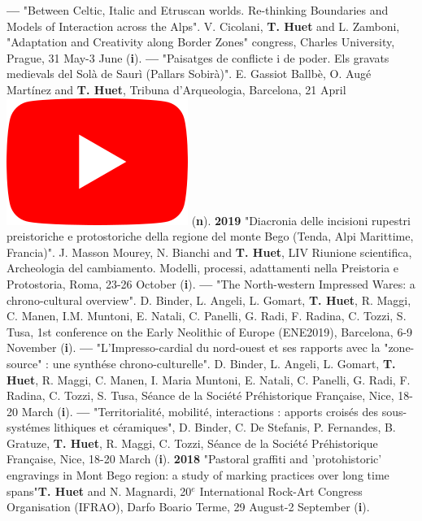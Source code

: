 \documentclass{article}
\begin{document}
\smallbreak
\textbf{--- }"Between Celtic, Italic and Etruscan worlds. Re-thinking Boundaries and Models of Interaction across the Alps". V. Cicolani, \textbf{T. Huet} and L. Zamboni, "Adaptation and Creativity along Border Zones" congress, Charles University, Prague, 31 May-3 June (\textbf{i}).
\smallbreak
\textbf{--- }"Paisatges de conflicte i de poder. Els gravats medievals del Sol\`{a} de Saur\`{i} (Pallars Sobir\`{a})". E. Gassiot Ballb\`{e}, O. Aug\'{e} Mart\'{i}nez and \textbf{T. Huet}, Tribuna d'Arqueologia, Barcelona, 21 April \href{https://www.youtube.com/watch?v=4b7gLw4NV_E}{\includegraphics[scale=0.2]{icon_youtube}} (\textbf{n}).
\smallbreak
\textbf{2019 }"Diacronia delle incisioni rupestri preistoriche e protostoriche della regione del monte Bego (Tenda, Alpi Marittime, Francia)". J. Masson Mourey, N. Bianchi and \textbf{T. Huet}, LIV Riunione scientifica, Archeologia del cambiamento. Modelli, processi, adattamenti nella Preistoria e Protostoria, Roma, 23-26 October (\textbf{i}).
\smallbreak
\textbf{--- }"The North-western Impressed Wares: a chrono-cultural overview". D. Binder, L. Angeli, L. Gomart, \textbf{T. Huet}, R. Maggi, C. Manen, I.M. Muntoni, E. Natali, C. Panelli, G. Radi, F. Radina, C. Tozzi, S. Tusa, 1st conference on the Early Neolithic of Europe (ENE2019), Barcelona, 6-9 November (\textbf{i}).
\smallbreak
\textbf{--- }"L'Impresso-cardial du nord-ouest et ses rapports avec la "zone-source" : une synth\'{e}se chrono-culturelle". D. Binder, L. Angeli, L. Gomart, \textbf{T. Huet}, R. Maggi, C. Manen, I. Maria Muntoni, E. Natali, C. Panelli, G. Radi, F. Radina, C. Tozzi, S. Tusa, S\'{e}ance de la Soci\'{e}t\'{e} Pr\'{e}historique Fran\c{c}aise, Nice, 18-20 March (\textbf{i}).
\smallbreak
\textbf{--- }"Territorialit\'{e}, mobilit\'{e}, interactions : apports crois\'{e}s des sous-syst\'{e}mes lithiques et c\'{e}ramiques", D. Binder, C. De Stefanis, P. Fernandes, B. Gratuze, \textbf{T. Huet}, R. Maggi, C. Tozzi, S\'{e}ance de la Soci\'{e}t\'{e} Pr\'{e}historique Fran\c{c}aise, Nice, 18-20 March (\textbf{i}).
\smallbreak
\textbf{2018 }"Pastoral graffiti and 'protohistoric' engravings in Mont Bego region: a study of marking practices over long time spans"\textbf{T. Huet} and N. Magnardi, 20${}^{e}$ International Rock-Art Congress Organisation (IFRAO), Darfo Boario Terme, 29 August-2 September (\textbf{i}).
\end{document}
